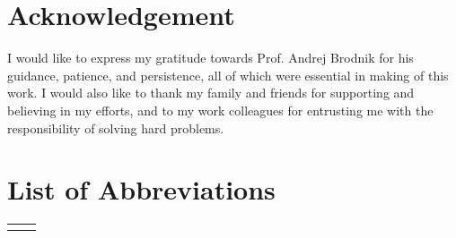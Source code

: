 \section*{Acknowledgement}
I would like to express my gratitude towards Prof. Andrej Brodnik for his guidance, patience, and persistence, all of which were essential in making of this work.
I would also like to thank my family and friends for supporting and believing in my efforts, and to my work colleagues for entrusting me with the responsibility of solving hard problems.

\newpage

\tableofcontents
{}
\newpage
\listoftables
{}
\newpage
\listoffigures
{}
\newpage
\renewcommand{\cftdot}{}
\thispagestyle{fancy}
\newpage

\section*{List of Abbreviations}
\thispagestyle{fancyplain}
\begin{longtable}{@{}p{1cm}@{}p{\dimexpr\textwidth-1cm\relax}@{}}
\nomenclature{$ZKP$}{Zero-Knowledge Proof}
\nomenclature{$EAP$}{Extensible Authentication Protocol}
\end{longtable}
\newpage

\normalsize




